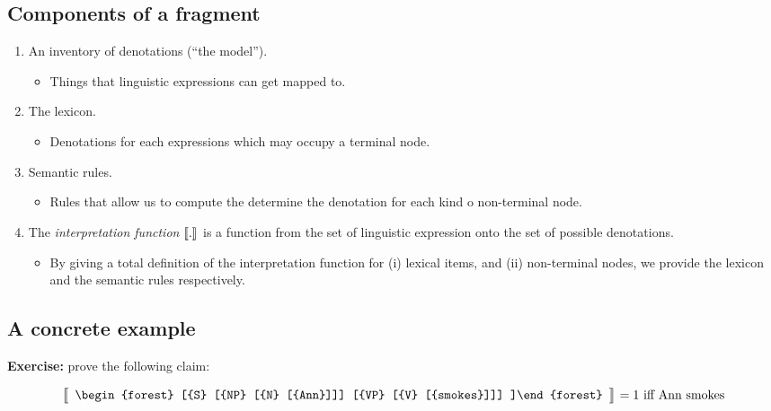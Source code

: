 \documentclass[letterpaper,parskip=half]{scrartcl}
\begin{document}
\subsection{Components of a fragment}
\label{sec:orgaecc998}

\begin{enumerate}
\item An inventory of denotations (``the model'').
\begin{itemize}
\item Things that linguistic expressions can get mapped to.
\end{itemize}
\item The lexicon.
\begin{itemize}
\item Denotations for each expressions which may occupy a terminal node.
\end{itemize}
\item Semantic rules.
\begin{itemize}
\item Rules that allow us to compute the determine the denotation for each kind o non-terminal node.
\end{itemize}

\item The \emph{interpretation function} \(\eval{.}\) is a function from the set of linguistic expression onto the set of possible denotations.
\begin{itemize}
\item By giving a total definition of the interpretation function for (i) lexical items, and (ii) non-terminal nodes, we provide the lexicon and the semantic rules respectively.
\end{itemize}
\end{enumerate}
\subsection{A concrete example}
\label{sec:org92d4359}

\textbf{Exercise:} prove the following claim:

\[\eval*{\begin{array}{c}
\begin{forest}
    [{S}
      [{NP} [{N} [{Ann}]]]
      [{VP} [{V} [{smokes}]]]
    ]\end{forest}
\end{array}} = 1\text{ iff Ann smokes}\]

\printbibliography
\end{document}
